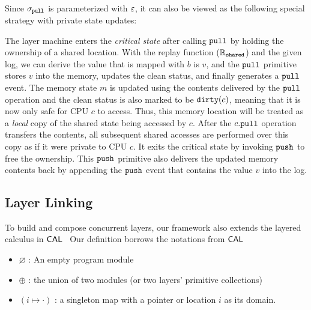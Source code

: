 Since $\sigma_{\mathrm{\texttt{pull}}}$ is parameterized with $\oracle$, it can also be viewed as the following special strategy  with private state updates:%
\begin{center}
\end{center}
The layer machine enters the \emph{critical state} after calling ${\mathrm{\texttt{pull}}}$ by holding the ownership
of a shared location.
With the replay function ($\mathbb{R}_{{\mathrm{\texttt{shared}}}}$) and the given log, 
we can derive the value that is mapped with $b$ is $v$, 
and the ${\mathrm{\texttt{pull}}}$ primitive
stores  $v$  into the memory, updates the clean status,
and finally generates a ${\mathrm{\texttt{pull}}}$ event.
The memory state $m$ is updated using the contents delivered
by the ${\mathrm{\texttt{pull}}}$ operation
and  the clean status is also marked to be ${\mathrm{\texttt{dirty}}}(c)$,
meaning that it is now only safe for CPU $c$ to access.
Thus, this memory location will be treated as
a \emph{local}
copy of the shared state being accessed by $c$.
After the $c.{\mathrm{\texttt{pull}}}$ operation transfers the contents,
all subsequent shared accesses are performed over this 
copy as if it were private to CPU $c$.
It exits the critical state by invoking ${\mathrm{\texttt{push}}}$ to free the ownership.
This ${\mathrm{\texttt{push}}}$ primitive also delivers the updated memory contents back 
by appending the ${\mathrm{\texttt{push}}}$ event that contains the value $v$ into the log.




\subsection{Layer Linking}
\label{chapter:ccal:subsec:linking}

To build and compose concurrent layers, 
our framework also extends the layered calculus in $\mathsf{CAL}$~\cite{deepspec}
Our definition borrows the notations
from $\mathsf{CAL}$
\begin{itemize}
\item $\varnothing$ : An  empty program module
\item $\oplus$ : the union of two modules (or two layers' primitive collections)
\item $(i\mapsto \cdot)$ : a singleton map with a pointer or location $i$ as its domain.
\end{itemize}

